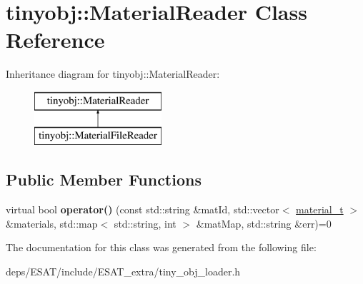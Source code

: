 \hypertarget{classtinyobj_1_1_material_reader}{}\section{tinyobj\+:\+:Material\+Reader Class Reference}
\label{classtinyobj_1_1_material_reader}
Inheritance diagram for tinyobj\+:\+:Material\+Reader\+:\begin{figure}[H]
\begin{center}
\leavevmode
\includegraphics[height=2.000000cm]{classtinyobj_1_1_material_reader}
\end{center}
\end{figure}
\subsection*{Public Member Functions}
\begin{DoxyCompactItemize}
\item 
\mbox{\label{classtinyobj_1_1_material_reader_afa193c78cea3a3618808165ba19697e0}} 
virtual bool {\bfseries operator()} (const std\+::string \&mat\+Id, std\+::vector$<$ \mbox{\hyperlink{structtinyobj_1_1material__t}{material\+\_\+t}} $>$ \&materials, std\+::map$<$ std\+::string, int $>$ \&mat\+Map, std\+::string \&err)=0
\end{DoxyCompactItemize}


The documentation for this class was generated from the following file\+:\begin{DoxyCompactItemize}
\item 
deps/\+E\+S\+A\+T/include/\+E\+S\+A\+T\+\_\+extra/tiny\+\_\+obj\+\_\+loader.\+h\end{DoxyCompactItemize}
